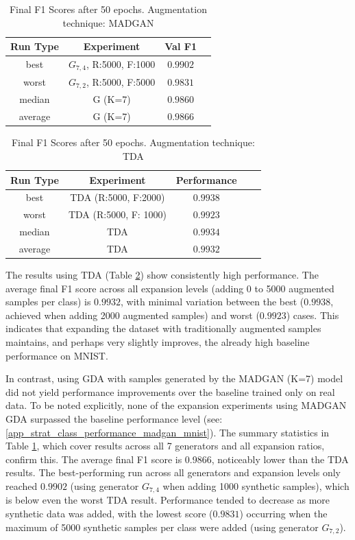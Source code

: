 \begin{table}[H]
	\vspace{-1.5em}
	\centering
	\begin{tabular}{|c|c|c|c|}
		\hline
		Run Type & Experiment & Val F1 \\ \hline
		best & \(G_{7, 4}\), R:5000, F:1000 & $0.9902$\\ \hline
		worst & \(G_{7, 2}\), R:5000, F:5000 & $0.9831$\\ \hline
		median & G (K=7) & $0.9860$\\ \hline
		average & G (K=7) & $0.9866$
		\\ \hline
	\end{tabular}
    \caption{Final F1 Scores after 50 epochs. Augmentation technique: MADGAN}
        \label{tab:res_expansion_mnist_tda_vs_madgan__madgan}
\end{table}
\begin{table}[H]
	\centering
	\vspace{-1.5em}
	\begin{tabular}{|c|c|c|c|c|}
		\hline
		Run Type & Experiment & Performance \\ \hline
		best & TDA (R:5000, F:2000) & $0.9938$\\ \hline
		worst & TDA (R:5000, F: 1000) & $0.9923$\\ \hline
		median & TDA & $0.9934$\\ \hline
		average & TDA & $0.9932$
		\\ \hline
	\end{tabular}
    \caption{Final F1 Scores after 50 epochs. Augmentation technique: TDA}
        \label{tab:res_expansion_mnist_tda_vs_madgan__tda}
\end{table}

The results using TDA (Table \ref{tab:res_expansion_mnist_tda_vs_madgan__tda}) show consistently high performance. The average final F1 score across all expansion levels (adding 0 to 5000 augmented samples per class) is $0.9932$, with minimal variation between the best ($0.9938$, achieved when adding 2000 augmented samples) and worst ($0.9923$) cases. This indicates that expanding the dataset with traditionally augmented samples maintains, and perhaps very slightly improves, the already high baseline performance on MNIST.

In contrast, using GDA with samples generated by the MADGAN (K=7) model did not yield performance improvements over the baseline trained only on real data. To be noted explicitly, none of the expansion experiments using MADGAN GDA surpassed the baseline performance level (see: \ref{app_strat_class_performance_madgan_mnist}). The summary statistics in Table \ref{tab:res_expansion_mnist_tda_vs_madgan__madgan}, which cover results across all 7 generators and all expansion ratios, confirm this. The average final F1 score is 0.9866, noticeably lower than the TDA results. The best-performing run across all generators and expansion levels only reached $0.9902$ (using generator \(G_{7,4}\) when adding 1000 synthetic samples), which is below even the worst TDA result. Performance tended to decrease as more synthetic data was added, with the lowest score ($0.9831$) occurring when the maximum of 5000 synthetic samples per class were added (using generator \(G_{7,2}\)).

